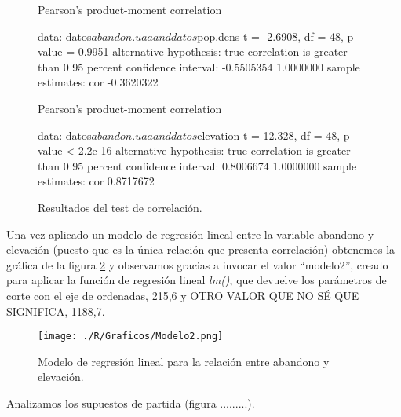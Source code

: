 \documentclass[11pt,a4paper]{article}
\begin{document}
\begin{figure}
\centering
\begin{boxedverbatim}
    Pearson's product-moment correlation

data:  datos$abandon.uaa and datos$pop.dens
t = -2.6908, df = 48, p-value = 0.9951
alternative hypothesis: true correlation is greater than 0
95 percent confidence interval:
 -0.5505354  1.0000000
sample estimates:
       cor 
-0.3620322
\end{boxedverbatim}

\begin{boxedverbatim}
    Pearson's product-moment correlation

data:  datos$abandon.uaa and datos$elevation
t = 12.328, df = 48, p-value < 2.2e-16
alternative hypothesis: true correlation is greater than 0
95 percent confidence interval:
 0.8006674 1.0000000
sample estimates:
       cor 
0.8717672 
\end{boxedverbatim}
\caption{Resultados del test de correlación.}
\label{fig:res.corr}
\end{figure}

Una vez aplicado un modelo de regresión lineal entre la variable abandono y elevación (puesto que es la única relación que presenta correlación) obtenemos la gráfica de la figura \ref{fig:lm2} y observamos gracias a invocar el valor ``modelo2'', creado para aplicar la función de regresión lineal \textit{lm()}, que devuelve los parámetros de corte con el eje de ordenadas, 215,6 y OTRO VALOR QUE NO SÉ QUE SIGNIFICA, 1188,7.

\begin{figure}
	\centering
	\texttt{[image: ./R/Graficos/Modelo2.png]}
	\caption{Modelo de regresión lineal para la relación entre abandono y elevación.}
	\label{fig:lm2}
\end{figure}

Analizamos los supuestos de partida (figura .........).
\end{document}
